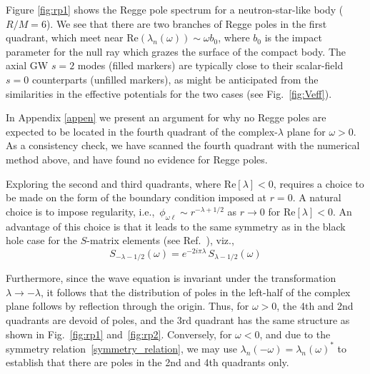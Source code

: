 \documentclass[aps,prd,longbibliography,reprint,twocolumn,amsmath,amssymb,amsfonts,showpacs,footnote,superscriptaddress]{revtex4-1}%
\begin{document}
Figure \ref{fig:rp1} shows the Regge pole spectrum for a neutron-star-like body ($R/M = 6$). We see that there are two branches of Regge poles in the first quadrant, which meet near $\text{Re}( \lambda_n(\omega) ) \sim \omega b_0$, where $b_0$ is the impact parameter for the null ray which grazes the surface of the compact body. The axial GW $s=2$ modes (filled markers) are typically close to their scalar-field $s=0$ counterparts (unfilled markers), as might be anticipated from the similarities in the effective potentials for the two cases (see Fig.~\ref{fig:Veff}).

In Appendix \ref{appen} we present an argument for why no Regge poles are expected to be located in the fourth quadrant of the complex-$\lambda$ plane for $\omega>0$. As a consistency check, we have scanned the fourth quadrant with the numerical method above, and have found no evidence for Regge poles.

Exploring the second and third quadrants, where $\text{Re}[{\lambda}] < 0$, requires a choice to be made on the form of the boundary condition imposed at $r=0$. A natural choice is to impose regularity, i.e.,~$\phi_{\omega\ell} \sim r^{-\lambda+1/2}$ as $r \rightarrow 0$ for $\text{Re} [\lambda] < 0$. An advantage of this choice is that it leads to the same symmetry as in the black hole case for the $S$-matrix elements (see Ref.~\cite{Andersson:1994rk,Folacci:2019cmc}), viz.,
\begin{equation}\label{Matrix_S_CAM_symm}
S_{-\lambda -1/2}(\omega) =  e^{-2i \pi \lambda} \, S_{\lambda -1/2}(\omega)
\end{equation}

Furthermore, since the wave equation is invariant under the transformation $\lambda \rightarrow -\lambda$, it follows that the distribution of poles in the left-half of the complex plane follows by reflection through the origin. Thus, for $\omega > 0$, the 4th and 2nd quadrants are devoid of poles, and the 3rd quadrant has the same structure as shown in Fig.~\ref{fig:rp1} and~\ref{fig:rp2}.
Conversely, for $\omega < 0$, and due to the symmetry relation~\eqref{symmetry_relation}, we may use $\lambda_n(-\omega) = \lambda_n(\omega)^*$ to establish that there are poles in the 2nd and 4th quadrants only.
\end{document}

